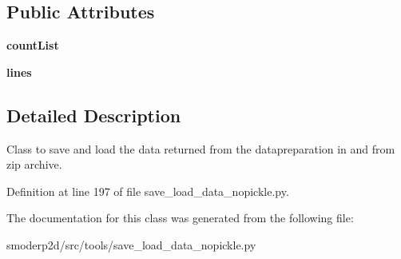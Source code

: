 \subsection*{Public Attributes}
\begin{DoxyCompactItemize}
\item 
\hypertarget{classsmoderp2d_1_1src_1_1tools_1_1save__load__data__nopickle_1_1SaveLoad_ad3bed899b380199e62bed31b6d40f0f2}{{\bfseries count\-List}}\label{classsmoderp2d_1_1src_1_1tools_1_1save__load__data__nopickle_1_1SaveLoad_ad3bed899b380199e62bed31b6d40f0f2}

\item 
\hypertarget{classsmoderp2d_1_1src_1_1tools_1_1save__load__data__nopickle_1_1SaveLoad_a3101022a38b6b958d8a05909b71208fb}{{\bfseries lines}}\label{classsmoderp2d_1_1src_1_1tools_1_1save__load__data__nopickle_1_1SaveLoad_a3101022a38b6b958d8a05909b71208fb}

\end{DoxyCompactItemize}


\subsection{Detailed Description}
Class to save and load the data returned from the datapreparation in and from zip archive. 

Definition at line 197 of file save\-\_\-load\-\_\-data\-\_\-nopickle.\-py.



The documentation for this class was generated from the following file\-:\begin{DoxyCompactItemize}
\item 
smoderp2d/src/tools/save\-\_\-load\-\_\-data\-\_\-nopickle.\-py\end{DoxyCompactItemize}

